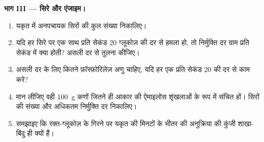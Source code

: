 \begin{problem}
\medskip
\noindent\textbf{भाग III --- सिरे और एंजाइम।}
\begin{enumerate}[resume]
  \item यकृत में अनपचायक सिरों की कुल संख्या निकालिए।
  \item यदि हर सिरे पर एक साथ प्रति सेकंड \qty{20}{} ग्लूकोज़ की दर से
        हमला हो, तो निर्मुक्ति दर ग्राम प्रति सेकंड में क्या होती?
        असली दर से तुलना कीजिए।
  \item असली दर के लिए कितने फ़ॉस्फ़ोरिलेज़ अणु चाहिए, यदि हर एक प्रति
        सेकंड \qty{20}{} की दर से काम करे?
  \item मान लीजिए वही \qty{100}{g} कणों जितने ही आकार की ऐमाइलोस
        शृंखलाओं के रूप में संचित हों। सिरों की संख्या और अधिकतम
        निर्मुक्ति दर निकालिए।
  \item समझाइए कि रक्त-ग्लूकोज़ के गिरने पर यकृत की मिनटों के भीतर की
        अनुक्रिया की कुंजी शाखा-बिंदु ही क्यों हैं।
\end{enumerate}


\end{problem}
